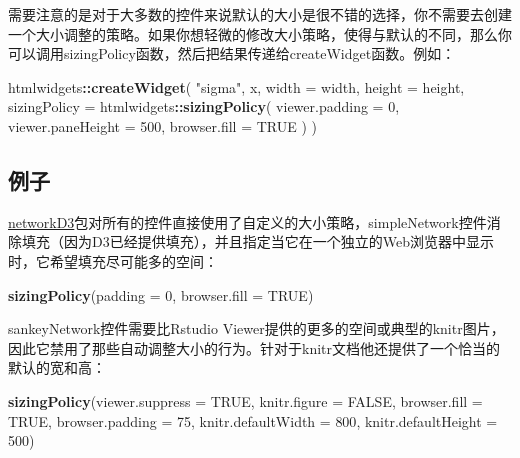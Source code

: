 \documentclass[]{book}
\newenvironment{Shaded}{\begin{snugshade}}{\end{snugshade}}
\newcommand{\KeywordTok}[1]{\textcolor[rgb]{0.13,0.29,0.53}{\textbf{#1}}}
\newcommand{\DataTypeTok}[1]{\textcolor[rgb]{0.13,0.29,0.53}{#1}}
\newcommand{\DecValTok}[1]{\textcolor[rgb]{0.00,0.00,0.81}{#1}}
\newcommand{\StringTok}[1]{\textcolor[rgb]{0.31,0.60,0.02}{#1}}
\newcommand{\OtherTok}[1]{\textcolor[rgb]{0.56,0.35,0.01}{#1}}
\newcommand{\OperatorTok}[1]{\textcolor[rgb]{0.81,0.36,0.00}{\textbf{#1}}}
\newcommand{\NormalTok}[1]{#1}
\theoremstyle{definition}
\theoremstyle{definition}
\theoremstyle{definition}
\theoremstyle{remark}
\begin{document}
需要注意的是对于大多数的控件来说默认的大小是很不错的选择，你不需要去创建一个大小调整的策略。如果你想轻微的修改大小策略，使得与默认的不同，那么你可以调用sizingPolicy函数，然后把结果传递给createWidget函数。例如：

\begin{Shaded}
\begin{Highlighting}[]
\NormalTok{htmlwidgets}\OperatorTok{::}\KeywordTok{createWidget}\NormalTok{(}
  \StringTok{"sigma"}\NormalTok{, }
\NormalTok{  x, }
  \DataTypeTok{width =}\NormalTok{ width, }
  \DataTypeTok{height =}\NormalTok{ height,}
  \DataTypeTok{sizingPolicy =}\NormalTok{ htmlwidgets}\OperatorTok{::}\KeywordTok{sizingPolicy}\NormalTok{(}
    \DataTypeTok{viewer.padding =} \DecValTok{0}\NormalTok{,}
    \DataTypeTok{viewer.paneHeight =} \DecValTok{500}\NormalTok{,}
    \DataTypeTok{browser.fill =} \OtherTok{TRUE}
\NormalTok{  )}
\NormalTok{)}
\end{Highlighting}
\end{Shaded}

\subsection{例子}\label{-1}

\href{http://christophergandrud.github.io/networkD3/}{networkD3}包对所有的控件直接使用了自定义的大小策略，simpleNetwork控件消除填充（因为D3已经提供填充），并且指定当它在一个独立的Web浏览器中显示时，它希望填充尽可能多的空间：

\begin{Shaded}
\begin{Highlighting}[]
\KeywordTok{sizingPolicy}\NormalTok{(}\DataTypeTok{padding =} \DecValTok{0}\NormalTok{, }\DataTypeTok{browser.fill =} \OtherTok{TRUE}\NormalTok{)}
\end{Highlighting}
\end{Shaded}

sankeyNetwork控件需要比Rstudio
Viewer提供的更多的空间或典型的knitr图片，因此它禁用了那些自动调整大小的行为。针对于knitr文档他还提供了一个恰当的默认的宽和高：

\begin{Shaded}
\begin{Highlighting}[]
\KeywordTok{sizingPolicy}\NormalTok{(}\DataTypeTok{viewer.suppress =} \OtherTok{TRUE}\NormalTok{,}
             \DataTypeTok{knitr.figure =} \OtherTok{FALSE}\NormalTok{,}
             \DataTypeTok{browser.fill =} \OtherTok{TRUE}\NormalTok{,}
             \DataTypeTok{browser.padding =} \DecValTok{75}\NormalTok{,}
             \DataTypeTok{knitr.defaultWidth =} \DecValTok{800}\NormalTok{,}
             \DataTypeTok{knitr.defaultHeight =} \DecValTok{500}\NormalTok{)}
\end{Highlighting}
\end{Shaded}
\end{document}
